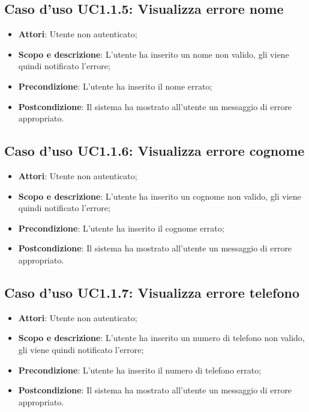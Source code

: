 \documentclass[12pt,a4paper,titlepage]{article}
\begin{document}
	\subsection{Caso d'uso UC1.1.5: Visualizza errore nome}
	\label{UC1.1.5}
	\begin{itemize}
		\item \textbf{Attori}: Utente non autenticato;
		\item \textbf{Scopo e descrizione}: L'utente ha inserito un nome non valido, gli viene quindi notificato l'errore;
		\item \textbf{Precondizione}: L'utente ha inserito il nome errato;
		\item \textbf{Postcondizione}: Il sistema ha mostrato all'utente un messaggio di errore appropriato.
	\end{itemize}
	\subsection{Caso d'uso UC1.1.6: Visualizza errore cognome}
	\label{UC1.1.6}
	\begin{itemize}
		\item \textbf{Attori}: Utente non autenticato;
		\item \textbf{Scopo e descrizione}: L'utente ha inserito un cognome non valido, gli viene quindi notificato l'errore;
		\item \textbf{Precondizione}: L'utente ha inserito il cognome errato;
		\item \textbf{Postcondizione}: Il sistema ha mostrato all'utente un messaggio di errore appropriato.
	\end{itemize}
	\subsection{Caso d'uso UC1.1.7: Visualizza errore telefono}
	\label{UC1.1.7}
	\begin{itemize}
		\item \textbf{Attori}: Utente non autenticato;
		\item \textbf{Scopo e descrizione}: L'utente ha inserito un numero di telefono non valido, gli viene quindi notificato l'errore;
		\item \textbf{Precondizione}: L'utente ha inserito il numero di telefono errato;
		\item \textbf{Postcondizione}: Il sistema ha mostrato all'utente un messaggio di errore appropriato.
	\end{itemize}
\end{document}
